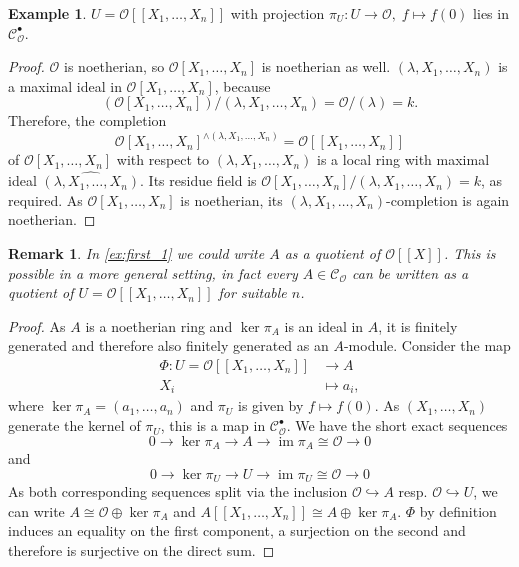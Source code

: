 \documentclass{article}
\theoremstyle{plain}%
\newtheorem{remark}{Remark}[section]
\theoremstyle{definition}
\newtheorem{example}{Example}[section]
\theoremstyle{remark}
\newcommand{\cob}{\mathcal{C}_\mathcal{O}^\bullet}
\newcommand{\co}{\mathcal{C}_\mathcal{O}}
\newcommand{\im}{\operatorname{im}}
\begin{document}

    \begin{example}\label{ex:last_1}
        \(U = \mathcal{O}[[X_1, \dots, X_n]]\) with projection \(\pi_U\colon U \to \mathcal{O},\; f \mapsto f(0)\) lies in \(\cob\).
        \begin{proof}
            \(\mathcal{O}\) is noetherian, so \(\mathcal{O}[X_1, \dots, X_{n}]\) is noetherian as well.
            \((\lambda, X_1, \dots, X_n)\) is a maximal ideal in \(\mathcal{O}[X_1, \dots, X_n]\), because
            \[\left(\mathcal{O}[X_1, \dots, X_n]\right)/(\lambda, X_1, \dots, X_n) = \mathcal{O}/(\lambda) = k.\]
            Therefore, the completion \[\mathcal{O}[X_1, \dots, X_n]^{\wedge(\lambda, X_1, \dots, X_n)} = \mathcal{O}[[X_1, \dots, X_n]]\]
            of \(\mathcal{O}[X_1, \dots, X_n]\) with respect to \((\lambda, X_1, \dots, X_n)\) is a local ring with maximal ideal
            \(\widehat{(\lambda, X_1, \dots, X_n)}\).
            Its residue field is \(\mathcal{O}[X_1, \dots, X_n]/(\lambda, X_1, \dots, X_n) = k\), as required.
            As \(\mathcal{O}[X_1, \dots, X_n]\) is noetherian, its \((\lambda, X_1, \dots, X_n)\)-completion is again noetherian.
        \end{proof}
    \end{example}

    \begin{remark}
        In \cref{ex:first_1} we could write \(A\) as a quotient of \(\mathcal{O}[[X]]\). 
        This is possible in a more general setting, in fact every \(A \in \co\) can be written as a quotient of
        \(U = \mathcal{O}[[X_1, \dots, X_n]]\) for suitable \(n\).
    \end{remark}
    \begin{proof}
        As \(A\) is a noetherian ring and \(\ker \pi_A\) is an ideal in \(A\), it is finitely generated and therefore also finitely generated
        as an \(A\)-module. Consider the map
        \begin{align*}
            \Phi\colon U = \mathcal{O}[[X_1, \dots, X_n]] &\to A\\
            X_i &\mapsto a_i,
        \end{align*}
        where \(\ker \pi_A = (a_1, \dots, a_n)\) and \(\pi_U\) is given by \(f \mapsto f(0)\). 
        As \((X_1, \dots, X_n)\) generate the kernel of \(\pi_U\), this is a map in \(\cob\).
        We have the short exact sequences
        \[
         0 \to \ker \pi_A \to A \to \im \pi_A \cong \mathcal{O} \to 0
        \]
        and
        \[
            0 \to \ker \pi_U \to U \to \im \pi_U \cong \mathcal{O} \to 0
        \]
        As both corresponding sequences split via the inclusion \(\mathcal{O} \hookrightarrow A\) resp. \(\mathcal{O} \hookrightarrow U\), 
        we can write \(A \cong \mathcal{O} \oplus \ker \pi_A\) and \(A[[X_1, \dots, X_n]] \cong A \oplus \ker \pi_A\).
        \(\Phi\) by definition induces an equality on the first component, a surjection on the second and therefore is surjective on the
        direct sum.
    \end{proof}
\end{document}
